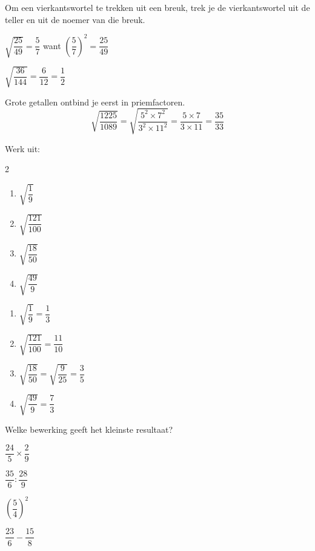 \documentclass{bis}
\begin{document}
\begin{onthoud}
Om een vierkantswortel te trekken uit een breuk, trek je de vierkantswortel uit de teller en uit de noemer van die breuk.
\end{onthoud}

\begin{voorbeeld}
$\sqrt{\dfrac{25}{49}}=\dfrac{5}{7}$ want $\left(\dfrac{5}{7}\right)^2=\dfrac{25}{49}$
\end{voorbeeld}

\begin{voorbeeld}
$\sqrt{\dfrac{36}{144}}=\dfrac{6}{12}=\dfrac{1}{2}$
\end{voorbeeld}

\begin{voorbeeld}
Grote getallen ontbind je eerst in priemfactoren.
\[\sqrt{\dfrac{1225}{1089}}=\sqrt{\dfrac{5^2\times 7^2}{3^2\times 11^2}}=\dfrac{5\times 7}{3\times 11}=\dfrac{35}{33}\]
\end{voorbeeld}

\begin{exercise}
Werk uit:
\begin{multicols}{2}
  \begin{enumerate}
    \item $\sqrt{\dfrac{1}{9}}$
    \item $\sqrt{\dfrac{121}{100}}$
    \item $\sqrt{\dfrac{18}{50}}$
    \item $\sqrt{\dfrac{49}{9}}$
  \end{enumerate}
\end{multicols}
\end{exercise}

\begin{solution}
  \begin{enumerate}
    \item $\sqrt{\dfrac{1}{9}}=\dfrac{1}{3}$
    \item $\sqrt{\dfrac{121}{100}}=\dfrac{11}{10}$
    \item $\sqrt{\dfrac{18}{50}}=\sqrt{\dfrac{9}{25}}=\dfrac{3}{5}$
    \item $\sqrt{\dfrac{49}{9}}=\dfrac{7}{3}$
  \end{enumerate}
\end{solution}

\begin{exercise}
Welke bewerking geeft het kleinste resultaat?
\begin{meerkeuze}
  \item $\dfrac{24}{5}\times\dfrac{2}{9}$
  \item $\dfrac{35}{6}:\dfrac{28}{9}$
  \item $\left(\dfrac{5}{4}\right)^2$
  \item $\dfrac{23}{6}-\dfrac{15}{8}$
\end{meerkeuze}
\end{exercise}
\end{document}
